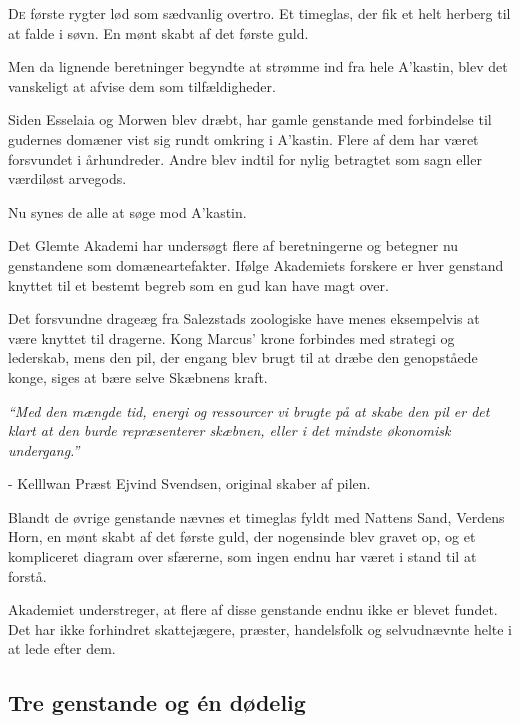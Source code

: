 \documentclass[a4paper,12pt]{memoir}
\newenvironment{pullquote}
  {\begin{tcolorbox}[enhanced, breakable]\itshape\large}
  {\end{tcolorbox}}
\begin{document}
\lettrine[lines=2,lhang=0.1,loversize=0.05]{D}{e} første rygter lød som sædvanlig overtro. Et timeglas, der fik et helt herberg til at falde i søvn. En mønt skabt af det første guld.

Men da lignende beretninger begyndte at strømme ind fra hele A'kastin, blev det vanskeligt at afvise dem som tilfældigheder.

\par\medskip

Siden Esselaia og Morwen blev dræbt, har gamle genstande med forbindelse til gudernes domæner vist sig rundt omkring i A'kastin. Flere af dem har været forsvundet i århundreder. Andre blev indtil for nylig betragtet som sagn eller værdiløst arvegods.

Nu synes de alle at søge mod A'kastin.



Det Glemte Akademi har undersøgt flere af beretningerne og betegner nu genstandene som domæneartefakter. Ifølge Akademiets forskere er hver genstand knyttet til et bestemt begreb som en gud kan have magt over.

Det forsvundne drageæg fra Salezstads zoologiske have menes eksempelvis at være knyttet til dragerne. Kong Marcus' krone forbindes med strategi og lederskab, mens den pil, der engang blev brugt til at dræbe den genopståede konge, siges at bære selve Skæbnens kraft.

\begin{pullquote}
``Med den mængde tid, energi og ressourcer vi brugte på at skabe den pil er det klart at den burde repræsenterer skæbnen, eller i det mindste økonomisk undergang.''

\par\smallskip
\raggedleft
- Kelllwan Præst Ejvind Svendsen, original skaber af pilen.
\end{pullquote}

Blandt de øvrige genstande nævnes et timeglas fyldt med Nattens Sand, Verdens Horn, en mønt skabt af det første guld, der nogensinde blev gravet op, og et kompliceret diagram over sfærerne, som ingen endnu har været i stand til at forstå.

Akademiet understreger, at flere af disse genstande endnu ikke er blevet fundet. Det har ikke forhindret skattejægere, præster, handelsfolk og selvudnævnte helte i at lede efter dem.

\subsection*{Tre genstande og én dødelig}
\end{document}
